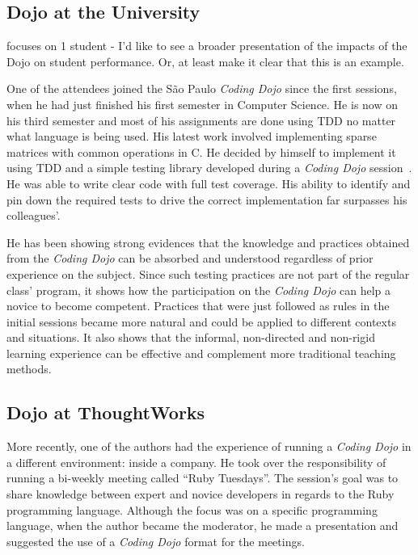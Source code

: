 \subsection{Dojo at the University}

{\Large focuses on 1 student - I'd like to see a broader presentation
  of the impacts of the Dojo on student performance. Or, at least make
  it clear that this is an example.}

One of the attendees joined the São Paulo \emph{Coding Dojo} since the first sessions,
when he had just finished his first semester in Computer Science. He is now on his third semester
and most of his assignments are done using TDD no matter what language is being used. His latest
work involved implementing sparse matrices with common operations in C. He decided by himself to
implement it using TDD and a simple testing library developed during a \emph{Coding Dojo}
session~\cite{Dojo31}. He was able to write clear code with full test coverage. His ability to
identify and pin down the required tests to drive the correct implementation far surpasses his
colleagues'.

He has been showing strong evidences that the knowledge and practices obtained from the
\emph{Coding Dojo} can be absorbed and understood regardless of prior experience on the
subject. Since such testing practices are not part of the regular class' program, it shows
how the participation on the \emph{Coding Dojo} can help a novice to become competent. Practices
that were just followed as rules in the initial sessions became more natural and could be applied
to different contexts and situations. It also shows that the informal, non-directed and non-rigid
learning experience can be effective and complement more traditional teaching methods.

\subsection{Dojo at ThoughtWorks}

More recently, one of the authors had the experience of running a \emph{Coding Dojo}
in a different environment: inside a company. He took over the responsibility of running a
bi-weekly meeting called ``Ruby Tuesdays''. The session's goal was to share knowledge between
expert and novice developers in regards to the Ruby programming language. Although the focus was on
a specific programming language, when the author became the moderator, he made a presentation
and suggested the use of a \emph{Coding Dojo} format for the meetings.


